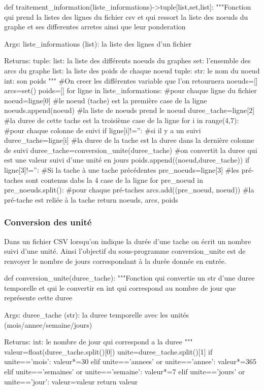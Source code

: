 \documentclass{article}
\begin{document}
\begin{python}
    def traitement_information(liste_informations)->tuple[list,set,list]:
    """Fonction qui prend la listes des lignes du fichier csv et qui ressort la liste des noeuds du graphe et ses differentes arretes ainsi que leur ponderation

    Args:
        liste_informations (list): la liste des lignes d'un fichier

    Returns:
        tuple: 
            list: la liste des différents noeuds du graphes 
            set: l'ensemble des arcs du graphe
            list: la liste des poids de chaque noeud
                tuple: 
                    str: le nom du noeud
                    int: son poids
    """
    #On creer les différentes variable que l'on retournera
    noeuds=[]
    arcs=set()
    poids=[]
    for ligne in liste_informations: #pour chaque ligne du fichier
        noeud=ligne[0] #le noeud (tache) est la première case de la ligne
        noeuds.append(noeud) #la liste de noeuds prend le noeud
        duree_tache=ligne[2] #la duree de cette tache est la troisième case de la ligne
        for i in range(4,7): #pour chaque colonne de suivi
            if ligne[i]!='': #si il y a un suivi
                duree_tache=ligne[i] #la duree de la tache est la duree dans la dernière colonne de suivi
        duree_tache=conversion_unite(duree_tache) #on convertit la duree qui est une valeur suivi d'une unité en jours
        poids.append((noeud,duree_tache)) 
        if ligne[3]!='': #Si la tache à une tache précédentes 
            pre_noeuds=ligne[3] #les pré-taches sont contenus dabs la 4 case de la ligne
            for pre_noeud in pre_noeuds.split(): #pour chaque pré-taches
                arcs.add((pre_noeud, noeud)) #la pré-tache est reliée à la tache
    return noeuds, arcs, poids
\end{python}

\subsubsection{Conversion des unité}
    Dans un fichier CSV lorsqu'on indique la durée d'une tache on écrit un nombre suivi d'une unité. Ainsi l'objectif du sous-programme conversion_unite est de renvoyer le nombre de jours correspondant à la durée donnée en entrée.
\begin{python}
    def conversion_unite(duree_tache):
    """Fonction qui convertie un str d'une duree temporelle et qui le convertir en int qui correspond au nombre de jour 
    que représente cette duree

    Args:
        duree_tache (str): la duree temporelle avec les unités (mois/annee/semaine/jours)

    Returns:
        int: le nombre de jour qui correspond a la duree
    """
    valeur=float(duree_tache.split()[0])
    unite=duree_tache.split()[1]
    if unite=='mois':
        valeur*=30
    elif unite=='annees' or unite=='annee':
        valeur*=365
    elif unite=='semaines' or unite=='semaine':
        valeur*=7
    elif unite=='jours' or unite=='jour':
        valeur=valeur
    return valeur
\end{python}
\end{document}
